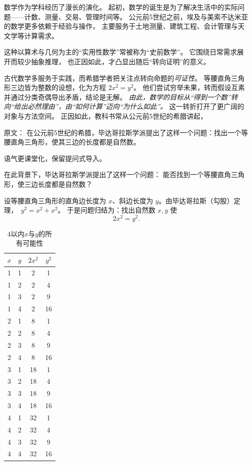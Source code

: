 数学作为学科经历了漫长的演化。  
起初，数学的诞生是为了解决生活中的实际问题——计数、测量、交易、管理时间等。  
公元前5世纪之前，埃及与美索不达米亚的数学更多依赖于经验与操作，  
主要服务于土地测量、建筑工程、会计管理与天文学等计算需求。

这种以算术与几何为主的“实用性数学”常被称为“史前数学”。  
它围绕日常需求展开而较少抽象推理，  
也正因如此，才凸显出随后“转向证明”的意义。

古代数学多服务于实践，而希腊学者把关注点转向命题的\emph{可证性}。  
等腰直角三角形三边皆为整数的设想，化为方程 $2x^2=y^2$。  
他们尝试穷举未果，转而假设互素并通过分类奇偶导出矛盾，结论是无解。  
\emph{由此，数学的目标从“得到一个数”转向“给出必然理由”，由“如何计算”迈向“为什么如此”。}  
这一转折打开了更广阔的对象与方法空间。
正因如此，教科书常从公元前5世纪的希腊讲起，  

原文：
在公元前5世纪的希腊，毕达哥拉斯学派提出了这样一个问题：找出一个等腰直角三角形，使其三边的长度都是自然数。

语气更课堂化，保留提问式导入。

在此背景下，毕达哥拉斯学派提出了这样一个问题：  
能否找到一个等腰直角三角形，使三边长度都是自然数？

设等腰直角三角形的直角边长度为 $x$、斜边长度为 $y$。由毕达哥拉斯（勾股）定理，~$y^2=x^2+x^2$。  
于是问题归结为：找出自然数 $x,y$ 使
\begin{equation}\label{eqn}
2x^2=y^2.
\end{equation}

\begin{table}[htbp]
\centering
\caption{4以内$x$与$y$的所有可能性}
\begin{tabular}{|c|c|c|c|}
\hline
$x$ & $y$ & $2x^2$ & $y^2$ \\
\hline
1 & 1 & 2 & 1 \\
\hline
1 & 2 & 2 & 4 \\
\hline
1 & 3 & 2 & 9 \\
\hline
1 & 4 & 2 & 16 \\
\hline
2 & 1 & 8 & 1 \\
\hline
2 & 2 & 8 & 4 \\
\hline
2 & 3 & 8 & 9 \\
\hline
2 & 4 & 8 & 16 \\
\hline
3 & 1 & 18 & 1 \\
\hline
3 & 2 & 18 & 4 \\
\hline
3 & 3 & 18 & 9 \\
\hline
3 & 4 & 18 & 16 \\
\hline
4 & 1 & 32 & 1 \\
\hline
4 & 2 & 32 & 4 \\
\hline
4 & 3 & 32 & 9 \\
\hline
4 & 4 & 32 & 16 \\
\hline
\end{tabular}
\label{tab:example}
\end{table}

